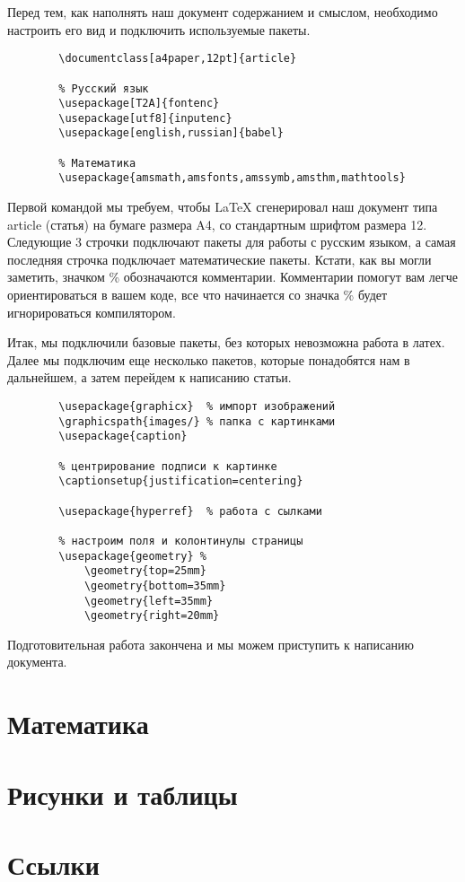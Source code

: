     Перед тем, как наполнять наш документ содержанием и смыслом, необходимо настроить его вид и подключить используемые пакеты.

    \begin{verbatim}
        \documentclass[a4paper,12pt]{article}

        % Русский язык
        \usepackage[T2A]{fontenc}
        \usepackage[utf8]{inputenc}	
        \usepackage[english,russian]{babel}

        % Математика
        \usepackage{amsmath,amsfonts,amssymb,amsthm,mathtools} 
    \end{verbatim}

    Первой командой мы требуем, чтобы \LaTeX{} сгенерировал наш документ типа article (статья) на бумаге размера A4, со стандартным шрифтом размера 12.
    Следующие 3 строчки подключают пакеты для работы с русским языком, а самая последняя строчка подключает математические пакеты.
    Кстати, как вы могли заметить, значком \% обозначаются комментарии. Комментарии помогут вам легче ориентироваться в вашем коде,
    все что начинается со значка \% будет игнорироваться компилятором.
    
    Итак, мы подключили базовые пакеты, без которых невозможна работа в латех. Далее мы подключим еще
    несколько пакетов, которые понадобятся нам в дальнейшем, а затем перейдем к написанию статьи.

    \begin{verbatim}
        \usepackage{graphicx}  % импорт изображений
        \graphicspath{images/} % папка с картинками
        \usepackage{caption}

        % центрирование подписи к картинке
        \captionsetup{justification=centering}

        \usepackage{hyperref}  % работа с сылками

        % настроим поля и колонтинулы страницы
        \usepackage{geometry} %
            \geometry{top=25mm}
            \geometry{bottom=35mm}
            \geometry{left=35mm}
            \geometry{right=20mm}
    \end{verbatim}

    Подготовительная работа закончена и мы можем приступить к написанию документа.

    \section{Математика}
    \section{Рисунки и таблицы}
    \section{Ссылки}
